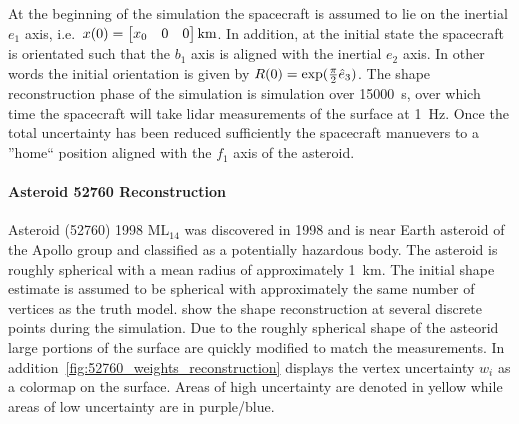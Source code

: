 At the beginning of the simulation the spacecraft is assumed to lie on the inertial \( e_1 \) axis, i.e.\ \( x(0) = \begin{bmatrix} x_0 & 0 & 0 \end{bmatrix} \si{\kilo\meter} \).
In addition, at the initial state the spacecraft is orientated such that the \( b_1 \) axis is aligned with the inertial \( e_2 \) axis.
In other words the initial orientation is given by \( R(0) = \exp(\frac{\pi}{2} \hat{e}_3)\).
The shape reconstruction phase of the simulation is simulation over \SI{15000}{\second}, over which time the spacecraft will take \gls{lidar} measurements of the surface at \SI{1}{\hertz}.
Once the total uncertainty has been reduced sufficiently the spacecraft manuevers to a ''home`` position aligned with the \( f_1 \) axis of the asteroid.

\paragraph{Asteroid 52760 Reconstruction}
Asteroid (\num{52760}) \num{1998} \(\text{ML}_{14}\) was discovered in \num{1998} and is near Earth asteroid of the Apollo group and classified as a potentially hazardous body.
The asteroid is roughly spherical with a mean radius of approximately \SI{1}{\kilo\meter}.
The initial shape estimate is assumed to be spherical with approximately the same number of vertices as the truth model.
 show the shape reconstruction at several discrete points during the simulation.
Due to the roughly spherical shape of the asteorid large portions of the surface are quickly modified to match the measurements.
In addition~\cref{fig:52760_weights_reconstruction} displays the vertex uncertainty \( w_i \) as a colormap on the surface. 
Areas of high uncertainty are denoted in yellow while areas of low uncertainty are in purple/blue.

